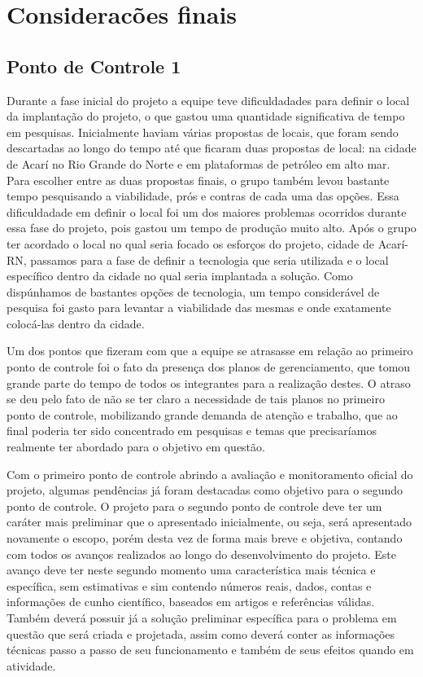 \chapter[Considerações finais]{Consideracões finais}

  \section{Ponto de Controle 1}

    Durante a fase inicial do projeto a equipe teve dificuldadades para definir o local da implantação do projeto,
    o que gastou uma quantidade significativa de tempo em pesquisas. Inicialmente haviam várias propostas de locais,
    que foram sendo descartadas ao longo do tempo até que ficaram duas propostas de local: na cidade de Acarí no Rio
    Grande do Norte e em plataformas de petróleo em alto mar. Para escolher entre as duas propostas finais, o grupo
    também levou bastante tempo pesquisando a viabilidade, prós e contras de cada uma das opções. Essa dificuldadade
    em definir o local foi um dos maiores problemas ocorridos durante essa fase do projeto, pois gastou um tempo de
    produção muito alto. Após o grupo ter acordado o local no qual seria focado os esforços do projeto, cidade de Acarí-RN,
    passamos para a fase de definir a tecnologia que seria utilizada e o local específico dentro da cidade no qual seria
    implantada a solução. Como dispúnhamos de bastantes opções de tecnologia, um tempo considerável de pesquisa foi gasto
    para levantar a viabilidade das mesmas e onde exatamente colocá-las dentro da cidade. 

    Um dos pontos que fizeram com que a equipe se atrasasse em relação ao primeiro ponto de controle foi o fato da
    presença dos planos de gerenciamento,  que tomou grande parte do tempo de todos os integrantes para a realização
    destes. O atraso se deu pelo fato de não se ter claro a necessidade de tais planos no primeiro ponto de controle,
    mobilizando grande demanda de atenção e trabalho, que ao final poderia ter sido concentrado em pesquisas e temas 
    que precisaríamos realmente ter abordado para o objetivo em questão.

    Com o primeiro ponto de controle abrindo a avaliação e monitoramento oficial do projeto, algumas pendências já
    foram destacadas como objetivo para o segundo ponto de controle. O projeto para o segundo ponto de controle deve
    ter um caráter mais preliminar que o apresentado inicialmente, ou seja, será apresentado novamente o escopo, porém
    desta vez de forma mais breve e objetiva, contando com todos os avanços realizados ao longo do desenvolvimento do 
    projeto. Este avanço deve ter neste segundo momento uma característica mais técnica e específica, sem estimativas
    e sim contendo números reais, dados, contas e informações de cunho científico, baseados em artigos e referências válidas.
    Também deverá possuir já a solução preliminar específica para o problema em questão que será criada e projetada,
    assim como deverá conter as informações técnicas passo a passo de seu funcionamento e também de seus efeitos quando
    em atividade.

